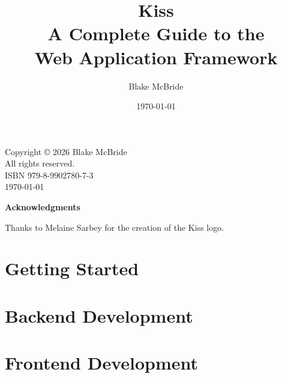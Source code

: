 \documentclass[11pt,twoside,openright]{book}
\title{
  \vspace{2cm}
  {\Huge\bfseries Kiss}\\[0.5cm]
  {\LARGE A Complete Guide to the\\Web Application Framework}\\[2cm]
  \vfill
}
\author{\Large Blake McBride}
\date{\today}
\begin{document}
\frontmatter
\maketitle

\thispagestyle{empty}
\vspace*{\fill}
\begin{center}
Copyright \copyright{} 2026 Blake McBride\\
All rights reserved.\\[6pt]
ISBN 979-8-9902780-7-3\\[6pt]
\today
\end{center}
\vspace*{\fill}
\clearpage

\thispagestyle{empty}
\vspace*{2in}
\begin{center}
{\Large\bfseries Acknowledgments}

\bigskip
Thanks to Melaine Sarbey for the creation of the Kiss logo.
\end{center}
\clearpage

\tableofcontents

\mainmatter

\part{Getting Started}






\part{Backend Development}







\part{Frontend Development}








\end{document}
